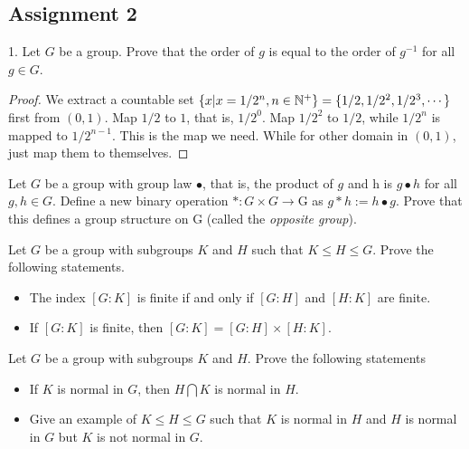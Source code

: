 \subsection{Assignment 2}

\begin{exercise}
1. Let $G$ be a group. Prove that the order of $g$ is equal to the order of $g^{-1}$ for all $g\in G$.
\end{exercise}

\begin{proof}
We extract a countable set $\{x|x=1/2^n,n\in {\mathbb{N}}^+ \}=\{1/2,1/2^2,1/2^3,\cdots\}$ first from $(0,1)$. Map $1/2$ to $1$, that is, $1/2^0$. Map $1/2^2$ to $1/2$, while $1/2^n$ is mapped to $1/2^{n-1}$. This is the map we need. While for other domain in $(0,1)$, just map them to themselves. 
\end{proof}

\begin{exercise}
    Let $G$ be a group with group law $\bullet$, that is, the product of $g$ and h is $g \bullet h$ for all $g, h \in G$.
    Define a new binary operation $* : G \times G \rightarrow $G as $g * h := h \bullet g$. Prove that this defines a group structure on G (called the \textit{opposite group}).
\end{exercise}

\begin{exercise}
    Let $G$ be a group with subgroups $K$ and $H$ such that $K \leq H \leq G$. Prove the following statements.
    \begin{itemize}
        \item  The index $[G : K]$ is finite if and only if $[G : H]$ and $[H : K]$ are finite.
        \item If $[G : K]$ is finite, then $[G : K] = [G : H] \times [H : K]$.

    \end{itemize}
\end{exercise}

\begin{exercise}
    Let $G$ be a group with subgroups $K$ and $H$. Prove the following statements
    \begin{itemize}
        \item  If $K$ is normal in $G$, then $H \bigcap K$ is normal in $H$.
        \item Give an example of $K \leq H \leq G$ such that $K$ is normal in $H$ and $H$ is normal in $G$ but $K$ is not normal in $G$.
        
    \end{itemize}
\end{exercise}


